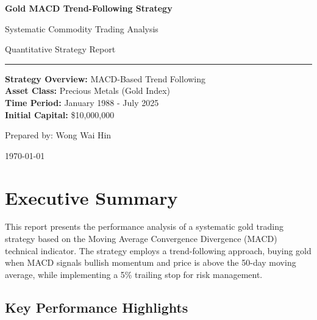 \documentclass[11pt,a4paper]{article}
\begin{document}
\begin{titlepage}
\centering
\vspace*{2cm}

{\Huge\bfseries Gold MACD Trend-Following Strategy}

\vspace{1cm}

{\LARGE Systematic Commodity Trading Analysis}

\vspace{2cm}

{\Large Quantitative Strategy Report}

\vspace{1cm}

\rule{\linewidth}{0.2mm}

\vspace{1cm}

{\large
\textbf{Strategy Overview:} MACD-Based Trend Following\\
\textbf{Asset Class:} Precious Metals (Gold Index)\\
\textbf{Time Period:} January 1988 - July 2025\\
\textbf{Initial Capital:} \$10,000,000\\
}

\vspace{2cm}

{\large Prepared by: Wong Wai Hin}

\vspace{0.5cm}

{\large \today}

\vfill

\end{titlepage}

\section{Executive Summary}

This report presents the performance analysis of a systematic gold trading strategy based on the Moving Average Convergence Divergence (MACD) technical indicator. The strategy employs a trend-following approach, buying gold when MACD signals bullish momentum and price is above the 50-day moving average, while implementing a 5\% trailing stop for risk management.

\subsection{Key Performance Highlights}
\end{document}
